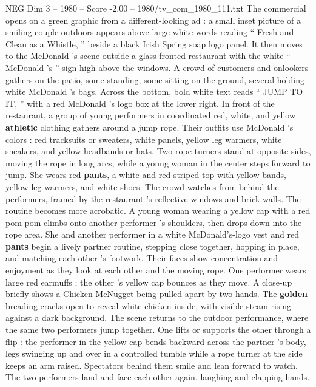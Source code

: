\begin{textsample}{NEG Dim 3 – 1980 – Score -2.00 – 1980/tv\_com\_1980\_111.txt}  \label{ex:f3_neg_055}
The commercial opens on a green graphic from a different-looking ad : a small inset picture of a smiling couple outdoors appears above large white words reading “ Fresh and Clean as a Whistle, ” beside a black Irish Spring soap logo panel.
It then moves to the McDonald ’s scene outside a glass-fronted restaurant with the white “ McDonald ’s ” sign high above the windows.
A crowd of customers and onlookers gathers on the patio, some standing, some sitting on the ground, several holding white McDonald ’s bags.
Across the bottom, bold white text reads “ JUMP TO IT, ” with a red McDonald ’s logo box at the lower right.
In front of the restaurant, a group of young performers in coordinated red, white, and yellow \textbf{athletic} clothing gathers around a jump rope.
Their outfits use McDonald ’s colors : red tracksuits or sweaters, white panels, yellow leg warmers, white sneakers, and yellow headbands or hats.
Two rope turners stand at opposite sides, moving the rope in long arcs, while a young woman in the center steps forward to jump.
She wears red \textbf{pants}, a white-and-red striped top with yellow bands, yellow leg warmers, and white shoes.
The crowd watches from behind the performers, framed by the restaurant ’s reflective windows and brick walls.
The routine becomes more acrobatic.
A young woman wearing a yellow cap with a red pom-pom climbs onto another performer ’s shoulders, then drops down into the rope area.
She and another performer in a white McDonald’s-logo vest and red \textbf{pants} begin a lively partner routine, stepping close together, hopping in place, and matching each other ’s footwork.
Their faces show concentration and enjoyment as they look at each other and the moving rope.
One performer wears large red earmuffs ; the other ’s yellow cap bounces as they move.
A close-up briefly shows a Chicken McNugget being pulled apart by two hands.
The \textbf{golden} breading cracks open to reveal white chicken inside, with visible steam rising against a dark background.
The scene returns to the outdoor performance, where the same two performers jump together.
One lifts or supports the other through a flip : the performer in the yellow cap bends backward across the partner ’s body, legs swinging up and over in a controlled tumble while a rope turner at the side keeps an arm raised.
Spectators behind them smile and lean forward to watch.
The two performers land and face each other again, laughing and clapping hands.

\end{textsample}
